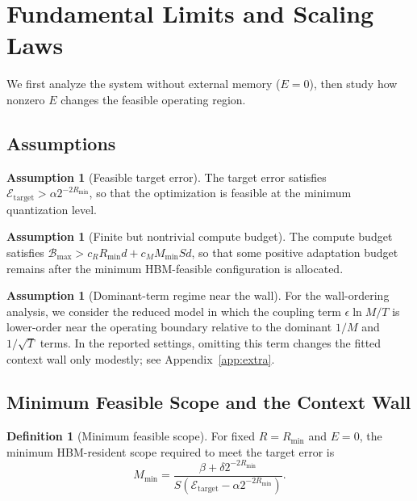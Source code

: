 \documentclass[11pt,a4paper]{article}
\theoremstyle{plain}
\theoremstyle{definition}
\newtheorem{definition}[theorem]{Definition}
\newtheorem{assumption}[theorem]{Assumption}
\begin{document}
\section{Fundamental Limits and Scaling Laws}
\label{sec:theory}

We first analyze the system without external memory ($E=0$), then study how nonzero $E$ changes the feasible operating region.

\subsection{Assumptions}
\begin{assumption}[Feasible target error]\label{ass:feasible}
The target error satisfies $\mathcal{E}_{\text{target}} > \alpha 2^{-2R_{\min}}$, so that the optimization is feasible at the minimum quantization level.
\end{assumption}

\begin{assumption}[Finite but nontrivial compute budget]\label{ass:compute}
The compute budget satisfies $\mathcal{B}_{\max} > c_R R_{\min} d + c_M M_{\min} S d$, so that some positive adaptation budget remains after the minimum HBM-feasible configuration is allocated.
\end{assumption}

\begin{assumption}[Dominant-term regime near the wall]\label{ass:dominant}
For the wall-ordering analysis, we consider the reduced model in which the coupling term $\epsilon \ln M / T$ is lower-order near the operating boundary relative to the dominant $1/M$ and $1/\sqrt{T}$ terms. In the reported settings, omitting this term changes the fitted context wall only modestly; see Appendix~\ref{app:extra}.
\end{assumption}

\subsection{Minimum Feasible Scope and the Context Wall}
\begin{definition}[Minimum feasible scope]
For fixed $R=R_{\min}$ and $E=0$, the minimum HBM-resident scope required to meet the target error is
\begin{equation}
M_{\min} = \frac{\beta + \delta 2^{-2R_{\min}}}{S(\mathcal{E}_{\text{target}} - \alpha 2^{-2R_{\min}})}.
\label{eq:Mmin}
\end{equation}
\end{definition}
\end{document}
